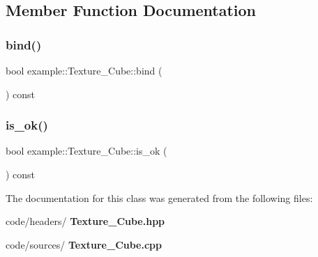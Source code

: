 \subsection{Member Function Documentation}
\mbox{\label{classexample_1_1_texture___cube_af2ead8631bcd59d2bbce051e2f495bdf}} 
\subsubsection{bind()}
{\footnotesize\ttfamily bool example\+::\+Texture\+\_\+\+Cube\+::bind (\begin{DoxyParamCaption}{ }\end{DoxyParamCaption}) const\hspace{0.3cm}{\ttfamily [inline]}}

\mbox{\label{classexample_1_1_texture___cube_a0b38a05575c874f9388809b5c044bcdc}} 
\subsubsection{is\_ok()}
{\footnotesize\ttfamily bool example\+::\+Texture\+\_\+\+Cube\+::is\+\_\+ok (\begin{DoxyParamCaption}{ }\end{DoxyParamCaption}) const\hspace{0.3cm}{\ttfamily [inline]}}



The documentation for this class was generated from the following files\+:\begin{DoxyCompactItemize}
\item 
code/headers/\textbf{ Texture\+\_\+\+Cube.\+hpp}\item 
code/sources/\textbf{ Texture\+\_\+\+Cube.\+cpp}\end{DoxyCompactItemize}

